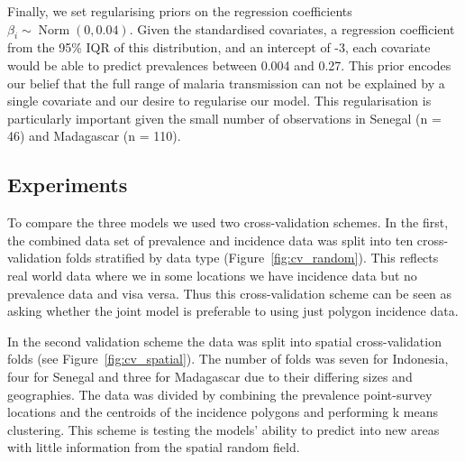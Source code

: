 \documentclass[10pt,letterpaper]{article}
\begin{document}
%
%
%
%
%
%
%

Finally, we set regularising priors on the regression coefficients $\beta_i \sim \operatorname{Norm}(0, 0.04)$. 
Given the standardised covariates, a regression coefficient from the 95\% IQR of this distribution, and an intercept of -3, each covariate would be able to predict prevalences between 0.004 and 0.27. 
This prior encodes our belief that the full range of malaria transmission can not be explained by a single covariate and our desire to regularise our model.
This regularisation is particularly important given the small number of observations in Senegal (n = 46) and Madagascar (n = 110).



\subsection*{Experiments}

To compare the three models we used two cross-validation schemes. 
In the first, the combined data set of prevalence and incidence data was split into ten cross-validation folds stratified by data type (Figure~\ref{fig:cv_random}).
This reflects real world data where we in some locations we have incidence data but no prevalence data and visa versa.
Thus this cross-validation scheme can be seen as asking whether the joint model is preferable to using just polygon incidence data.



In the second validation scheme the data was split into spatial cross-validation folds (see Figure~\ref{fig:cv_spatial}).
The number of folds was seven for Indonesia, four for Senegal and three for Madagascar due to their differing sizes and geographies.
The data was divided by combining the prevalence point-survey locations and the centroids of the incidence polygons and performing k means clustering.
This scheme is testing the models' ability to predict into new areas with little information from the spatial random field.
\end{document}

